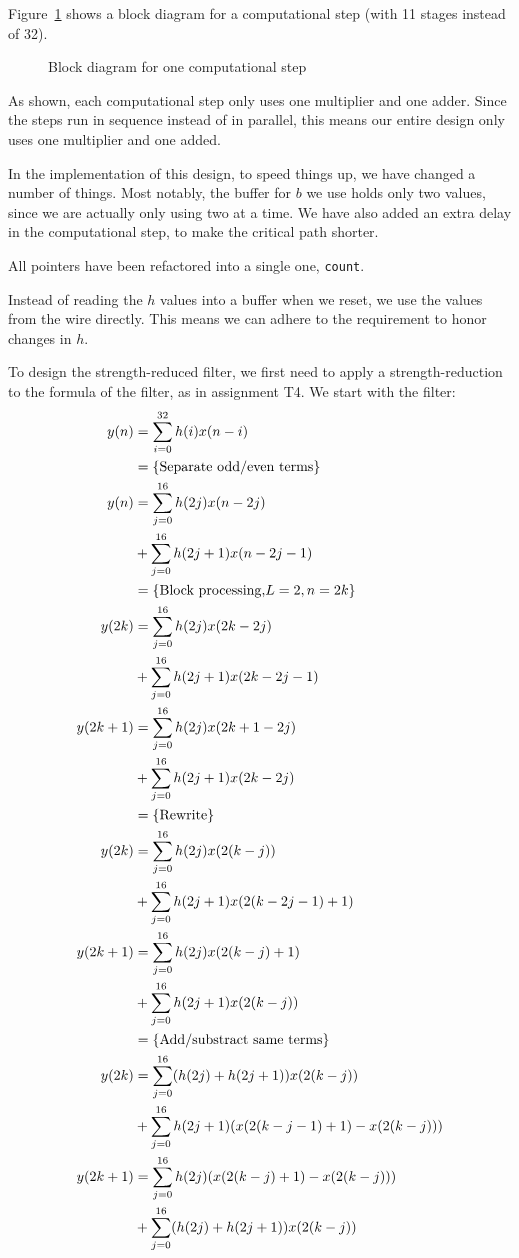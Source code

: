 Figure~\ref{fig:design:compstep} shows a block diagram for a computational step (with 11 stages instead of 32).

\begin{figure}[h]
	\centering
	\def\svgwidth{0.6\textwidth}
	
	\caption{Block diagram for one computational step}
	\label{fig:design:compstep}
\end{figure}

As shown, each computational step only uses one multiplier and one adder.
Since the steps run in sequence instead of in parallel, this means our entire design only uses one multiplier and one added.

In the implementation of this design, to speed things up, we have changed a number of things.
Most notably, the buffer for $b$ we use holds only two values, since we are actually only using two at a time.
We have also added an extra delay in the computational step, to make the critical path shorter.

All pointers have been refactored into a single one, \texttt{count}.

Instead of reading the $h$ values into a buffer when we reset, we use the values from the wire directly.
This means we can adhere to the requirement to honor changes in $h$.

\strengthfilter

To design the strength-reduced filter, we first need to apply a strength-reduction to the formula of the filter, as in assignment T4.
We start with the filter:
\begin{align*}
	y(n) &= \sum_{i=0}^{32} h(i)x(n-i)\\
	&= \{\textnormal{Separate odd/even terms}\}\\
	y(n) &= \sum_{j=0}^{16} h(2j)x(n-2j) \\
	&+ \sum_{j=0}^{16} h(2j+1)x(n-2j-1) \\
	&= \{\textnormal{Block processing,} L=2, n=2k\}\\
	y(2k) &= \sum_{j=0}^{16} h(2j)x(2k-2j) \\
	&+ \sum_{j=0}^{16} h(2j+1)x(2k-2j-1) \\
	y(2k+1) &= \sum_{j=0}^{16} h(2j)x(2k+1-2j) \\
	&+ \sum_{j=0}^{16} h(2j+1)x(2k-2j) \\
	&= \{\textnormal{Rewrite}\}\\
	y(2k) &= \sum_{j=0}^{16} h(2j)x(2(k-j)) \\
	&+ \sum_{j=0}^{16} h(2j+1)x(2(k-2j-1)+1) \\
	y(2k+1) &= \sum_{j=0}^{16} h(2j)x(2(k-j)+1) \\
	&+ \sum_{j=0}^{16} h(2j+1)x(2(k-j)) \\
	&= \{\textnormal{Add/substract same terms}\}\\
	y(2k) &= \sum_{j=0}^{16} (h(2j)+h(2j+1)) x(2(k-j)) \\
	&+ \sum_{j=0}^{16} h(2j+1) (x(2(k-j-1)+1) - x(2(k-j))) \\
	y(2k+1) &= \sum_{j=0}^{16} h(2j)(x(2(k-j)+1)-x(2(k-j))) \\
	&+ \sum_{j=0}^{16} (h(2j)+h(2j+1))x(2(k-j)) \\
\end{align*}

